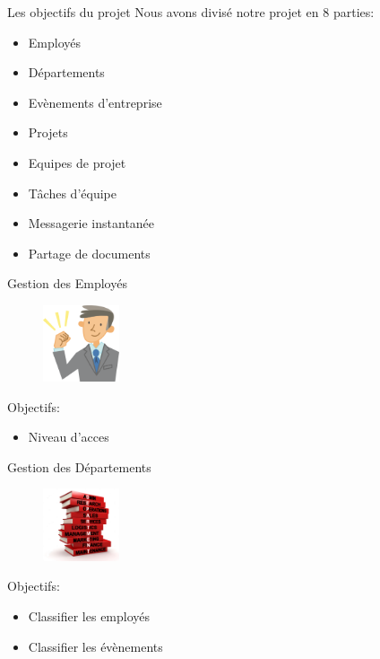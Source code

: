 \begin{frame}{Les objectifs du projet}
 Nous avons divisé notre projet en 8 parties:
  \begin{itemize}
  \item Employés
\item Départements
 \item Evènements d'entreprise
 \item Projets
 \item Equipes de projet
 \item Tâches d'équipe
  \item Messagerie instantanée
\item Partage de documents
    \end{itemize}
\end{frame}

\begin{frame}{Gestion des Employés}
\begin{figure}[h!]
  \includegraphics[width=0.2\textwidth]{images/employee}
\end{figure}
Objectifs:
  \begin{itemize}
    \item Niveau d'acces
  \end{itemize}
\end{frame}

\begin{frame}{Gestion des Départements}
\begin{figure}[h!]
  \includegraphics[width=0.2\textwidth]{images/department}
\end{figure}
Objectifs:
  \begin{itemize}
    \item Classifier les employés
    \item Classifier les évènements
  \end{itemize}
\end{frame}

